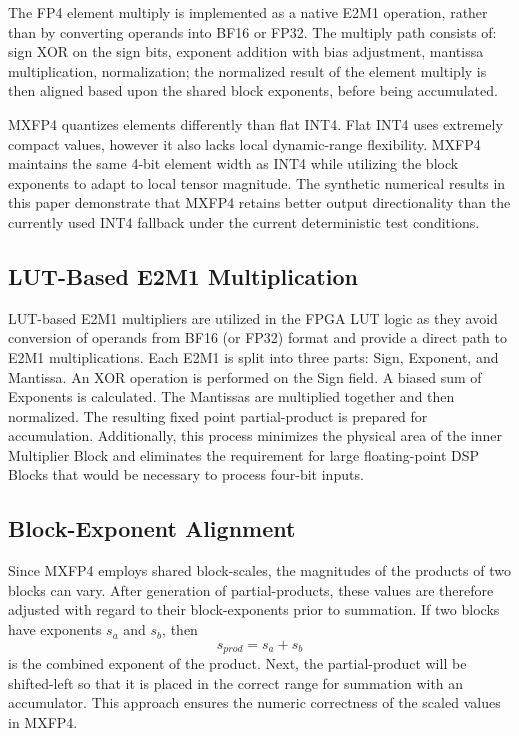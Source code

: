 ﻿\documentclass[conference]{IEEEtran}
\begin{document}
The FP4 element multiply is implemented as a native E2M1 operation, rather than by converting operands into BF16 or FP32. The multiply path consists of: sign XOR on the sign bits, exponent addition with bias adjustment, mantissa multiplication, normalization; the normalized result of the element multiply is then aligned based upon the shared block exponents, before being accumulated.

MXFP4 quantizes elements differently than flat INT4. Flat INT4 uses extremely compact values, however it also lacks local dynamic-range flexibility. MXFP4 maintains the same 4-bit element width as INT4 while utilizing the block exponents to adapt to local tensor magnitude. The synthetic numerical results in this paper demonstrate that MXFP4 retains better output directionality than the currently used INT4 fallback under the current deterministic test conditions.

\subsection{LUT-Based E2M1 Multiplication}
LUT-based E2M1 multipliers are utilized in the FPGA LUT logic as they avoid conversion of operands from BF16 (or FP32) format and provide a direct path to E2M1 multiplications. Each E2M1 is split into three parts: Sign, Exponent, and Mantissa. An XOR operation is performed on the Sign field. A biased sum of Exponents is calculated. The Mantissas are multiplied together and then normalized. The resulting fixed point partial-product is prepared for accumulation. Additionally, this process minimizes the physical area of the inner Multiplier Block and eliminates the requirement for large floating-point DSP Blocks that would be necessary to process four-bit inputs.

\subsection{Block-Exponent Alignment}
Since MXFP4 employs shared block-scales, the magnitudes of the products of two blocks can vary. After generation of partial-products, these values are therefore adjusted with regard to their block-exponents prior to summation. If two blocks have exponents $s_a$ and $s_b$, then
\begin{equation}
s_{prod} = s_a + s_b
\end{equation}
is the combined exponent of the product. Next, the partial-product will be shifted-left so that it is placed in the correct range for summation with an accumulator. This approach ensures the numeric correctness of the scaled values in MXFP4.
\end{document}
